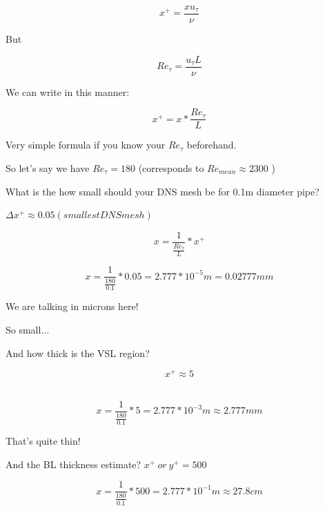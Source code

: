\documentclass[12pt]{article}
\renewcommand{\_}{\kern-1.5pt\textunderscore\kern-1.5pt}
\begin{document}
 \[ x^{+}=\frac{xu_{ \tau}}{ \nu } \] \par

But \par

 \[ Re_{ \tau}=\frac{u_{ \tau}L}{ \nu } \] \par

We can write in this manner:\par

 \[ x^{+}=x\ast\frac{Re_{ \tau}}{L} \] \par

Very simple formula if you know your  \( Re_{ \tau} \)  beforehand.\par

So let’s say we have  \( Re_{ \tau}=180 \)  (corresponds to  \( Re_{mean} \approx 2300 \) )\par

What is the how small should your DNS mesh be for 0.1m diameter pipe?\par

  \(  \Delta x^{+} \approx 0.05  \left( smallest DNS mesh \right)  \) \par

 \[ x=\frac{1}{\frac{{Re}_{ \tau}}{L}}\ast{x}^{+} \] \par

 \[ x=\frac{1}{\frac{180}{0.1}}\ast0.05=2.777\ast10^{-5}m=0.02777 mm \] \par


\vspace{\baselineskip}
We are talking in microns here!\par

So small$ \ldots $ \par

And how thick is the VSL region?\par

 \[ x^{+} \approx 5 \] \par

  \(  \)  \[ x=\frac{1}{\frac{180}{0.1}}\ast5=2.777\ast10^{-3}m \approx 2.777 mm \] \par

That’s quite thin!\par

And the BL thickness estimate?  \( x^{+}~or~y^{+}=500 \) \par

 \[ x=\frac{1}{\frac{180}{0.1}}\ast500=2.777\ast10^{-1}m \approx 27.8 cm \] \par
\end{document}
